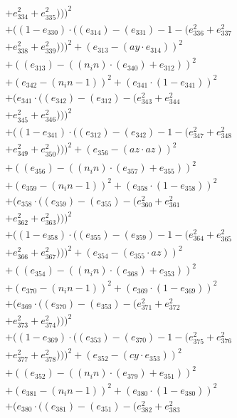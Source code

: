 \documentclass[10pt, a4paper]{article}
\begin{document}
\begin{small}
\begin{align*}
& + e_{334}^{2} + e_{335}^{2})))^{2} \\
& + ((1 - e_{330})  \cdot  ((e_{314}) - (e_{331}) - 1 - (e_{336}^{2} + e_{337}^{2} \\
& + e_{338}^{2} + e_{339}^{2})))^{2} + (e_{313} - (ay  \cdot  e_{314}))^{2} \\
& + ((e_{313}) - ((n_in)  \cdot  (e_{340}) + e_{312}))^{2} \\
& + (e_{342} - (n_in - 1))^{2} + (e_{341}  \cdot  (1 - e_{341}))^{2} \\
& + (e_{341}  \cdot  ((e_{342}) - (e_{312}) - (e_{343}^{2} + e_{344}^{2} \\
& + e_{345}^{2} + e_{346}^{2})))^{2} \\
& + ((1 - e_{341})  \cdot  ((e_{312}) - (e_{342}) - 1 - (e_{347}^{2} + e_{348}^{2} \\
& + e_{349}^{2} + e_{350}^{2})))^{2} + (e_{356} - (az  \cdot  az))^{2} \\
& + ((e_{356}) - ((n_in)  \cdot  (e_{357}) + e_{355}))^{2} \\
& + (e_{359} - (n_in - 1))^{2} + (e_{358}  \cdot  (1 - e_{358}))^{2} \\
& + (e_{358}  \cdot  ((e_{359}) - (e_{355}) - (e_{360}^{2} + e_{361}^{2} \\
& + e_{362}^{2} + e_{363}^{2})))^{2} \\
& + ((1 - e_{358})  \cdot  ((e_{355}) - (e_{359}) - 1 - (e_{364}^{2} + e_{365}^{2} \\
& + e_{366}^{2} + e_{367}^{2})))^{2} + (e_{354} - (e_{355}  \cdot  az))^{2} \\
& + ((e_{354}) - ((n_in)  \cdot  (e_{368}) + e_{353}))^{2} \\
& + (e_{370} - (n_in - 1))^{2} + (e_{369}  \cdot  (1 - e_{369}))^{2} \\
& + (e_{369}  \cdot  ((e_{370}) - (e_{353}) - (e_{371}^{2} + e_{372}^{2} \\
& + e_{373}^{2} + e_{374}^{2})))^{2} \\
& + ((1 - e_{369})  \cdot  ((e_{353}) - (e_{370}) - 1 - (e_{375}^{2} + e_{376}^{2} \\
& + e_{377}^{2} + e_{378}^{2})))^{2} + (e_{352} - (cy  \cdot  e_{353}))^{2} \\
& + ((e_{352}) - ((n_in)  \cdot  (e_{379}) + e_{351}))^{2} \\
& + (e_{381} - (n_in - 1))^{2} + (e_{380}  \cdot  (1 - e_{380}))^{2} \\
& + (e_{380}  \cdot  ((e_{381}) - (e_{351}) - (e_{382}^{2} + e_{383}^{2} \\

\end{align*}
\end{small}
\end{document}
